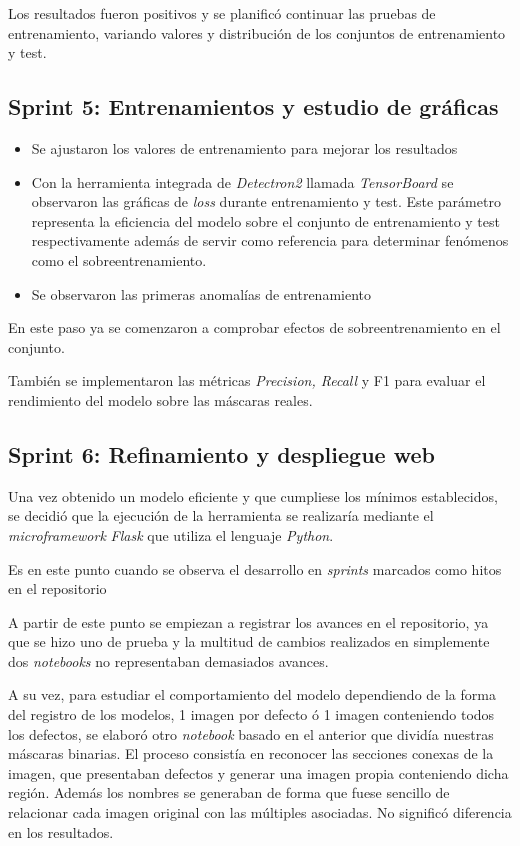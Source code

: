 Los resultados fueron positivos y se planificó continuar las pruebas de entrenamiento, variando valores y distribución de los conjuntos de entrenamiento y test.

\subsection{Sprint 5: Entrenamientos y estudio de gráficas}

\begin{itemize}
    \item Se ajustaron los valores de entrenamiento para mejorar los resultados
    \item Con la herramienta integrada de \emph{Detectron2} llamada \emph{TensorBoard} se observaron las gráficas de \emph{loss} durante entrenamiento y test. Este parámetro representa la eficiencia del modelo sobre el conjunto de entrenamiento y test respectivamente además de servir como referencia para determinar fenómenos como el sobreentrenamiento.
    \item Se observaron las primeras anomalías de entrenamiento
\end{itemize}

En este paso ya se comenzaron a comprobar efectos de sobreentrenamiento en el conjunto.

También se implementaron las métricas \emph{Precision, Recall} y F1 para evaluar el rendimiento del modelo sobre las máscaras reales.

\subsection{Sprint 6: Refinamiento y despliegue web}
Una vez obtenido un modelo eficiente y que cumpliese los mínimos establecidos, se decidió que la ejecución de la herramienta se realizaría mediante el \emph{microframework} \emph{Flask} que utiliza el lenguaje \emph{Python}.

Es en este punto cuando se observa el desarrollo en \emph{sprints} marcados como hitos en el repositorio \cite{repositorio:propio}

A partir de este punto se empiezan a registrar los avances en el repositorio, ya que se hizo uno de prueba y la multitud de cambios realizados en simplemente dos \emph{notebooks} no representaban demasiados avances.

A su vez, para estudiar el comportamiento del modelo dependiendo de la forma del registro de los modelos, 1 imagen por defecto ó 1 imagen conteniendo todos los defectos, se elaboró otro \emph{notebook} basado en el anterior que dividía nuestras máscaras binarias. 
El proceso consistía en reconocer las secciones conexas de la imagen, que presentaban defectos y generar una imagen propia conteniendo dicha región. Además los nombres se generaban de forma que fuese sencillo de relacionar cada imagen original con las múltiples asociadas. No significó diferencia en los resultados.

